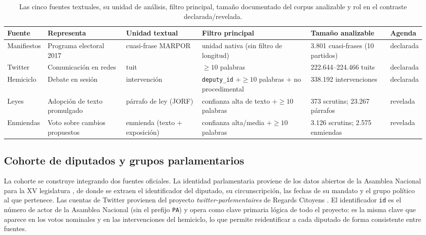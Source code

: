 \begin{table}[H]
\centering
\caption{Las cinco fuentes textuales, su unidad de análisis, filtro principal,
tamaño documentado del corpus analizable y rol en el contraste declarada/revelada.}
\label{tab:corpus-resumen}
\footnotesize
\setlength{\tabcolsep}{4pt}
\renewcommand{\arraystretch}{1.15}
\begin{tabularx}{\textwidth}{@{}l Y Y Y Y l@{}}
\toprule
\textbf{Fuente} & \textbf{Representa} & \textbf{Unidad textual} & \textbf{Filtro principal} & \textbf{Tamaño analizable} & \textbf{Agenda} \\
\midrule
Manifiestos & Programa electoral 2017 & cuasi-frase MARPOR & unidad nativa (sin filtro de longitud) & 3.801 cuasi-frases (10 partidos) & declarada \\
Twitter & Comunicación en redes & tuit & $\geq 10$ palabras & 222.644--224.466 tuits & declarada \\
Hemiciclo & Debate en sesión & intervención & \texttt{deputy\_id} $+\geq 10$ palabras $+$ no procedimental & 338.192 intervenciones & declarada \\
Leyes & Adopción de texto promulgado & párrafo de ley (JORF) & confianza alta de texto $+\geq 10$ palabras & 373 scrutins; 23.267 párrafos & revelada \\
Enmiendas & Voto sobre cambios propuestos & enmienda (texto $+$ exposición) & confianza alta/media $+\geq 10$ palabras & 3.126 scrutins; 2.575 enmiendas & revelada \\
\bottomrule
\end{tabularx}
\end{table}


\subsection{Cohorte de diputados y grupos parlamentarios}
\label{sec:datos-diputados}

La cohorte se construye integrando dos fuentes oficiales. La identidad
parlamentaria proviene de los datos abiertos de la Asamblea Nacional para la XV
legislatura \cite{an_opendata_xv}, de donde se extraen el identificador del
diputado, su circunscripción, las fechas de su mandato y el grupo político al
que pertenece. Las cuentas de Twitter provienen del proyecto
\emph{twitter-parlementaires} de Regards Citoyens \cite{regardscitoyens_twitter}.
El identificador \texttt{id} es el número de actor de la Asamblea Nacional (sin
el prefijo \texttt{PA}) y opera como clave primaria lógica de todo el proyecto:
es la misma clave que aparece en los votos nominales y en las intervenciones del
hemiciclo, lo que permite reidentificar a cada diputado de forma consistente
entre fuentes.

